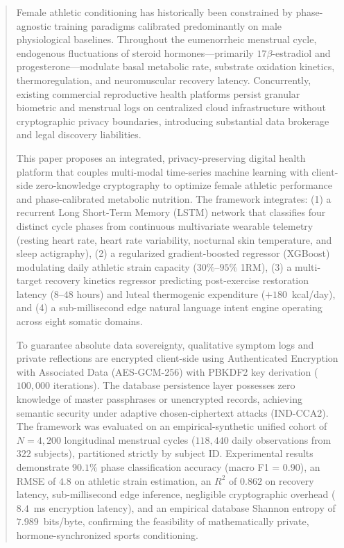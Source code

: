 \documentclass[conference]{IEEEtran}
\begin{document}
\begin{abstract}
Female athletic conditioning has historically been constrained by phase-agnostic training paradigms calibrated predominantly on male physiological baselines. Throughout the eumenorrheic menstrual cycle, endogenous fluctuations of steroid hormones---primarily $17\beta$-estradiol and progesterone---modulate basal metabolic rate, substrate oxidation kinetics, thermoregulation, and neuromuscular recovery latency. Concurrently, existing commercial reproductive health platforms persist granular biometric and menstrual logs on centralized cloud infrastructure without cryptographic privacy boundaries, introducing substantial data brokerage and legal discovery liabilities.

This paper proposes an integrated, privacy-preserving digital health platform that couples multi-modal time-series machine learning with client-side zero-knowledge cryptography to optimize female athletic performance and phase-calibrated metabolic nutrition. The framework integrates: (1) a recurrent Long Short-Term Memory (LSTM) network that classifies four distinct cycle phases from continuous multivariate wearable telemetry (resting heart rate, heart rate variability, nocturnal skin temperature, and sleep actigraphy), (2) a regularized gradient-boosted regressor (XGBoost) modulating daily athletic strain capacity ($30\%$--$95\%$ 1RM), (3) a multi-target recovery kinetics regressor predicting post-exercise restoration latency ($8$--$48$ hours) and luteal thermogenic expenditure ($+180$~kcal/day), and (4) a sub-millisecond edge natural language intent engine operating across eight somatic domains.

To guarantee absolute data sovereignty, qualitative symptom logs and private reflections are encrypted client-side using Authenticated Encryption with Associated Data (AES-GCM-256) with PBKDF2 key derivation ($100{,}000$ iterations). The database persistence layer possesses zero knowledge of master passphrases or unencrypted records, achieving semantic security under adaptive chosen-ciphertext attacks (IND-CCA2). The framework was evaluated on an empirical-synthetic unified cohort of $N = 4{,}200$ longitudinal menstrual cycles ($118{,}440$ daily observations from $322$ subjects), partitioned strictly by subject ID. Experimental results demonstrate $90.1\%$ phase classification accuracy (macro F1 = $0.90$), an RMSE of $4.8$ on athletic strain estimation, an $R^2$ of $0.862$ on recovery latency, sub-millisecond edge inference, negligible cryptographic overhead ($8.4$~ms encryption latency), and an empirical database Shannon entropy of $7.989$~bits/byte, confirming the feasibility of mathematically private, hormone-synchronized sports conditioning.
\end{abstract}
\end{document}
